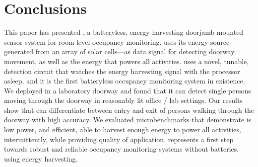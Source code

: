 \section{Conclusions}
\label{sec:conclusions}

This paper has presented \sysname, a batteryless, energy harvesting doorjamb mounted sensor system for room level occupancy monitoring.
\sysname uses its energy source---generated from an array of solar cells---as data signal for detecting doorway movement, as well as the energy that powers all activities.
\sysname uses a novel, tunable, detection circuit that watches the energy harvesting signal with the processor asleep, and it is the first batteryless occupancy monitoring system in existence.
We deployed \sysname in a laboratory doorway and found that it can detect single persons moving through the doorway in reasonably lit office / lab settings. Our results show that \sysname can differentiate between entry and exit of persons walking through the doorway with high accuracy. 
We evaluated \sysname microbenchmarks that demonstrate \sysname is low power, and efficient, able to harvest enough energy to power all activities, intermittently, while providing quality of application.
\sysname represents a first step towards robust and reliable occupancy monitoring systems without batteries, using energy harvesting.